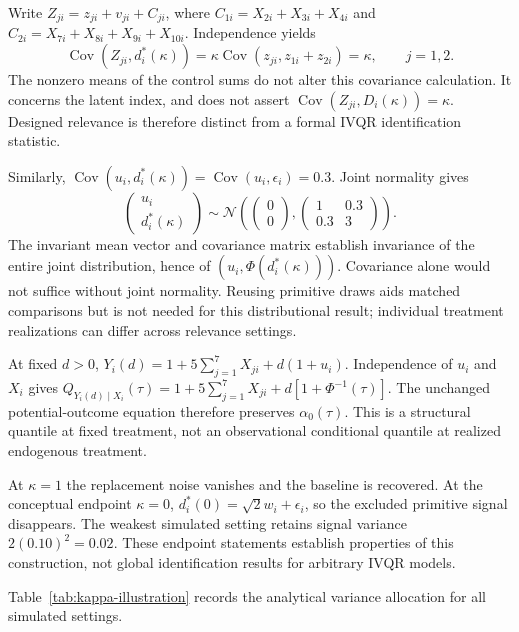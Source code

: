 Write $Z_{ji}=z_{ji}+v_{ji}+C_{ji}$, where $C_{1i}=X_{2i}+X_{3i}+X_{4i}$ and $C_{2i}=X_{7i}+X_{8i}+X_{9i}+X_{10i}$. Independence yields
\[
\operatorname{Cov}(Z_{ji},d_i^*(\kappa))
=\kappa\operatorname{Cov}(z_{ji},z_{1i}+z_{2i})=\kappa,
\qquad j=1,2.
\]
The nonzero means of the control sums do not alter this covariance calculation. It concerns the latent index, and does not assert $\operatorname{Cov}(Z_{ji},D_i(\kappa))=\kappa$. Designed relevance is therefore distinct from a formal IVQR identification statistic.

Similarly, $\operatorname{Cov}(u_i,d_i^*(\kappa))=\operatorname{Cov}(u_i,\epsilon_i)=0.3$. Joint normality gives
\begin{equation}
 \begin{pmatrix}u_i\\d_i^*(\kappa)\end{pmatrix}
 \sim\mathcal{N}\!\left(
 \begin{pmatrix}0\\0\end{pmatrix},
 \begin{pmatrix}1&0.3\\0.3&3\end{pmatrix}\right).
 \label{eq:appendix-endogeneity-invariance}
\end{equation}
The invariant mean vector and covariance matrix establish invariance of the entire joint distribution, hence of $(u_i,\Phi(d_i^*(\kappa)))$. Covariance alone would not suffice without joint normality. Reusing primitive draws aids matched comparisons but is not needed for this distributional result; individual treatment realizations can differ across relevance settings.

At fixed $d>0$, $Y_i(d)=1+5\sum_{j=1}^7X_{ji}+d(1+u_i)$. Independence of $u_i$ and $X_i$ gives $Q_{Y_i(d)\mid X_i}(\tau)=1+5\sum_{j=1}^7X_{ji}+d[1+\Phi^{-1}(\tau)]$. The unchanged potential-outcome equation therefore preserves $\alpha_0(\tau)$. This is a structural quantile at fixed treatment, not an observational conditional quantile at realized endogenous treatment.

At $\kappa=1$ the replacement noise vanishes and the baseline is recovered. At the conceptual endpoint $\kappa=0$, $d_i^*(0)=\sqrt2w_i+\epsilon_i$, so the excluded primitive signal disappears. The weakest simulated setting retains signal variance $2(0.10)^2=0.02$. These endpoint statements establish properties of this construction, not global identification results for arbitrary IVQR models.

Table~\ref{tab:kappa-illustration} records the analytical variance allocation for all simulated settings.

\FloatBarrier
